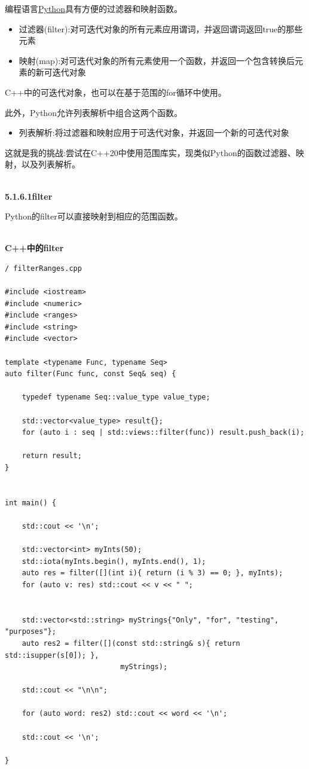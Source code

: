 编程语言\href{https://www.python.org/}{Python}具有方便的过滤器和映射函数。

\begin{itemize}
\item 
过滤器(filter):对可迭代对象的所有元素应用谓词，并返回谓词返回true的那些元素

\item 
映射(map):对可迭代对象的所有元素使用一个函数，并返回一个包含转换后元素的新可迭代对象
\end{itemize}

C++中的可迭代对象，也可以在基于范围的for循环中使用。

此外，Python允许列表解析中组合这两个函数。

\begin{itemize}
\item 
列表解析:将过滤器和映射应用于可迭代对象，并返回一个新的可迭代对象
\end{itemize}

这就是我的挑战:尝试在C++20中使用范围库实，现类似Python的函数过滤器、映射，以及列表解析。

\hspace*{\fill} \\ %
\noindent
\textbf{5.1.6.1\hspace{0.2cm}filter}

Python的filter可以直接映射到相应的范围函数。

\hspace*{\fill} \\ %
\noindent
\textbf{C++中的filter}
\begin{lstlisting}[style=styleCXX]
/ filterRanges.cpp

#include <iostream>
#include <numeric>
#include <ranges>
#include <string>
#include <vector>

template <typename Func, typename Seq>
auto filter(Func func, const Seq& seq) {

	typedef typename Seq::value_type value_type;
	
	std::vector<value_type> result{};
	for (auto i : seq | std::views::filter(func)) result.push_back(i);
	
	return result;
}


int main() {
	
	std::cout << '\n';
	
	std::vector<int> myInts(50);
	std::iota(myInts.begin(), myInts.end(), 1);
	auto res = filter([](int i){ return (i % 3) == 0; }, myInts);
	for (auto v: res) std::cout << v << " ";
	
	
	std::vector<std::string> myStrings{"Only", "for", "testing", "purposes"};
	auto res2 = filter([](const std::string& s){ return std::isupper(s[0]); },
	                       myStrings);
	
	std::cout << "\n\n";
	
	for (auto word: res2) std::cout << word << '\n';
	
	std::cout << '\n';

}
\end{lstlisting}

